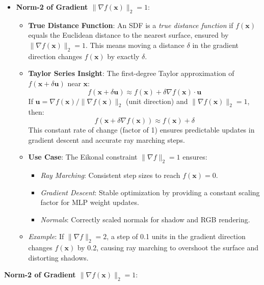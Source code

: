 \documentclass[12pt]{article}
\theoremstyle{definition}
\begin{document}
\begin{itemize}
\begin{itemize}
{        \end{itemize}
    \newpage
    \item \textbf{Norm-2 of Gradient \( \|\nabla f(\mathbf{x})\|_2 = 1 \)}:
        \begin{itemize}
            \item \textbf{True Distance Function}: An SDF is a \textit{true distance function} if \( f(\mathbf{x}) \) equals the Euclidean distance to the nearest surface, ensured by \( \|\nabla f(\mathbf{x})\|_2 = 1 \). This means moving a distance \( \delta \) in the gradient direction changes \( f(\mathbf{x}) \) by exactly \( \delta \).
            \item \textbf{Taylor Series Insight}: The first-degree Taylor approximation of \( f(\mathbf{x} + \delta \mathbf{u}) \) near \(\mathbf{x}\):
                \[
                f(\mathbf{x} + \delta \mathbf{u}) \approx f(\mathbf{x}) + \delta \nabla f(\mathbf{x}) \cdot \mathbf{u}
                \]
                If \( \mathbf{u} = \nabla f(\mathbf{x}) / \|\nabla f(\mathbf{x})\|_2 \) (unit direction) and \( \|\nabla f(\mathbf{x})\|_2 = 1 \), then:
                \[
                f(\mathbf{x} + \delta \nabla f(\mathbf{x})) \approx f(\mathbf{x}) + \delta
                \]
                This constant rate of change (factor of 1) ensures predictable updates in gradient descent and accurate ray marching steps.
            \item \textbf{Use Case}: The Eikonal constraint \( \|\nabla f\|_2 = 1 \) ensures:
                \begin{itemize}
                    \item \textit{Ray Marching}: Consistent step sizes to reach \( f(\mathbf{x}) = 0 \).
                    \item \textit{Gradient Descent}: Stable optimization by providing a constant scaling factor for MLP weight updates.
                    \item \textit{Normals}: Correctly scaled normals for shadow and RGB rendering.
                \end{itemize}
            \item \textit{Example}: If \( \|\nabla f\|_2 = 2 \), a step of 0.1 units in the gradient direction changes \( f(\mathbf{x}) \) by 0.2, causing ray marching to overshoot the surface and distorting shadows.
        \end{itemize}
\end{itemize}
    \item \textbf{Norm-2 of Gradient \( \|\nabla f(\mathbf{x})\|_2 = 1 \)}:
\end{document}
